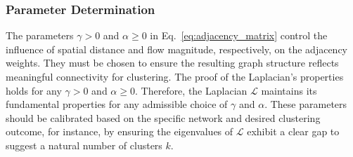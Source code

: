 \documentclass[lettersize,journal]{IEEEtran}
\newtheorem{theorem}{\normalfont\textbf{Theorem}}
\begin{document}
\subsubsection*{Parameter Determination}
The parameters $\gamma > 0$ and $\alpha \geq 0$ in Eq.~\eqref{eq:adjacency_matrix} control the influence of spatial distance and flow magnitude, respectively, on the adjacency weights. They must be chosen to ensure the resulting graph structure reflects meaningful connectivity for clustering. The proof of the Laplacian's properties holds for any $\gamma > 0$ and $\alpha \geq 0$. Therefore, the Laplacian $\mathcal{L}$ maintains its fundamental properties for any admissible choice of $\gamma$ and $\alpha$. These parameters should be calibrated based on the specific network and desired clustering outcome, for instance, by ensuring the eigenvalues of $\mathcal{L}$ exhibit a clear gap to suggest a natural number of clusters $k$.
\end{document}
